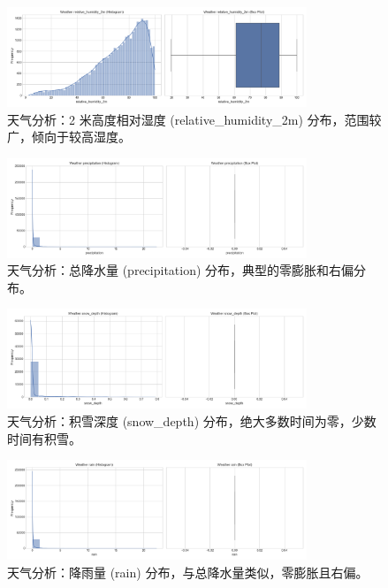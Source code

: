 \documentclass{article} %
\begin{document}
\begin{figure}[H]
    \centering
    \includegraphics[width=0.8\textwidth]{../plots/weather_distribution_relative_humidity_2m.png}
    \caption{天气分析：2 米高度相对湿度 (relative\_humidity\_2m) 分布，范围较广，倾向于较高湿度。} %
    \label{fig:weather_dist_humidity}
\end{figure}

\begin{figure}[H]
    \centering
    \includegraphics[width=0.8\textwidth]{../plots/weather_distribution_precipitation.png}
    \caption{天气分析：总降水量 (precipitation) 分布，典型的零膨胀和右偏分布。} %
    \label{fig:weather_dist_precip}
\end{figure}

\begin{figure}[H]
    \centering
    \includegraphics[width=0.8\textwidth]{../plots/weather_distribution_snow_depth.png}
    \caption{天气分析：积雪深度 (snow\_depth) 分布，绝大多数时间为零，少数时间有积雪。} %
    \label{fig:weather_dist_snow}
\end{figure}

\begin{figure}[H]
    \centering
    \includegraphics[width=0.8\textwidth]{../plots/weather_distribution_rain.png}
    \caption{天气分析：降雨量 (rain) 分布，与总降水量类似，零膨胀且右偏。} %
    \label{fig:weather_dist_rain}
\end{figure}
\end{document}
